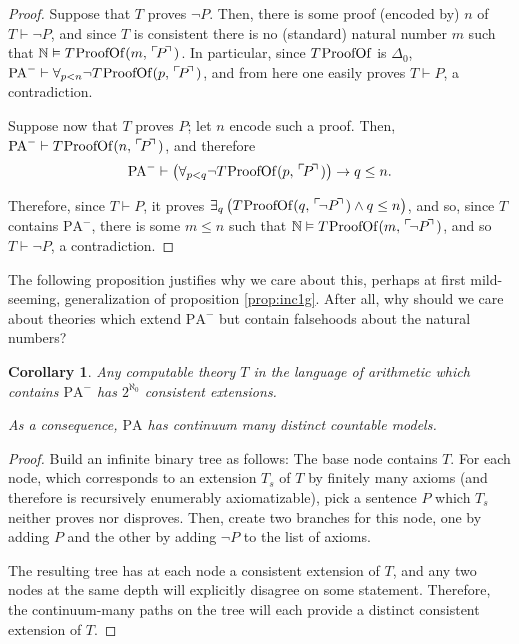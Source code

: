 \documentclass{article}
\newtheorem{corollary}[theorem]{Corollary}
\theoremstyle{nonumberplain}
\newtheorem{proof}{Proof}
\newcommand{\N}{\mathbb{N}}
\newcommand{\PA}{\mathrm{PA}}
\newcommand{\WPA}{\PA^-}
\DeclareMathOperator{\ProofOf}{\mspace{-2mu}ProofOf}
\newcommand{\gn}[1]{\setbox0=\hbox{$\mathclap{\phantom{t}}#1$} \dimen0=\ht0 \advance\dimen0 by -1.25ex \,\raise\dimen0\hbox{$\ulcorner$} \! \box0 \! \raise\dimen0\hbox{$\urcorner$}\,}
\begin{document}
\begin{proof}
Suppose that $T$ proves $\neg P$. Then, there is some proof (encoded by) $n$ of $T \vdash \neg P$, and since $T$ is consistent there is no (standard) natural number $m$ such that $\N \vDash T\ProofOf(m, \gn{P})$. In particular, since $T\ProofOf$ is $\Delta_0$, $\WPA \vdash \forall_{p < n} \neg T\ProofOf(p,\gn{P})$, and from here one easily proves $T \vdash P$, a contradiction.

Suppose now that $T$ proves $P$; let $n$ encode such a proof. Then, $\WPA \vdash T\ProofOf(n,\gn{P})$, and therefore
\begin{equation}
\WPA \vdash \left( \forall_{p<q} \neg T\ProofOf(p,\gn P) \right) \rightarrow q \leq n.
\end{equation}

Therefore, since $T \vdash P$, it proves $\exists_q \left( T\ProofOf(q,\gn{\neg P}) \land q \leq n \right)$, and so, since $T$ contains $\WPA$, there is some $m \leq n$ such that $\N \vDash T\ProofOf(m, \gn{\neg P})$, and so $T \vdash \neg P$, a contradiction.
\end{proof}

The following proposition justifies why we care about this, perhaps at first mild-seeming, generalization of proposition \ref{prop:inc1g}. After all, why should we care about theories which extend $\WPA$ but contain falsehoods about the natural numbers?

\begin{corollary}
Any computable theory $T$ in the language of arithmetic which contains $\WPA$ has $2^{\aleph_0}$ consistent extensions.

As a consequence, $\PA$ has continuum many distinct countable models.
\end{corollary}

\begin{proof}
Build an infinite binary tree as follows: The base node contains $T$. For each node, which corresponds to an extension $T_s$ of $T$ by finitely many axioms (and therefore is recursively enumerably axiomatizable), pick a sentence $P$ which $T_s$ neither proves nor disproves. Then, create two branches for this node, one by adding $P$ and the other by adding $\neg P$ to the list of axioms.

The resulting tree has at each node a consistent extension of $T$, and any two nodes at the same depth will explicitly disagree on some statement. Therefore, the continuum-many paths on the tree will each provide a distinct consistent extension of $T$.
\end{proof}
\end{document}
